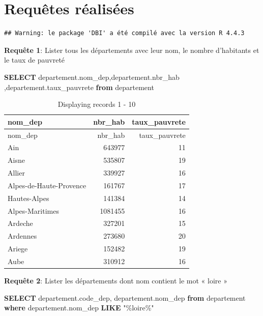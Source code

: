 \documentclass[mstat,12pt]{unswthesis}
\newenvironment{Shaded}{\begin{snugshade}}{\end{snugshade}}
\newcommand{\KeywordTok}[1]{\textcolor[rgb]{0.13,0.29,0.53}{\textbf{#1}}}
\newcommand{\NormalTok}[1]{#1}
\newcommand{\OtherTok}[1]{\textcolor[rgb]{0.56,0.35,0.01}{#1}}
\begin{document}
\bigskip

\section{Requêtes réalisées}\label{requuxeates-ruxe9alisuxe9es}

\begin{verbatim}
## Warning: le package 'DBI' a été compilé avec la version R 4.4.3
\end{verbatim}

\textbf{Requête 1}: Lister tous les départements avec leur nom, le
nombre d'habitants et le taux de pauvreté

\begin{Shaded}
\begin{Highlighting}[]
\KeywordTok{SELECT}\NormalTok{ departement.nom\_dep,departement.nbr\_hab ,departement.taux\_pauvrete}
\KeywordTok{from}\NormalTok{ departement}
\end{Highlighting}
\end{Shaded}

\begin{longtable}[]{@{}lrr@{}}
\caption{Displaying records 1 - 10}\tabularnewline
\toprule\noalign{}
nom\_dep & nbr\_hab & taux\_pauvrete \\
\midrule\noalign{}
\endfirsthead
\toprule\noalign{}
nom\_dep & nbr\_hab & taux\_pauvrete \\
\midrule\noalign{}
\endhead
\bottomrule\noalign{}
\endlastfoot
Ain & 643977 & 11 \\
Aisne & 535807 & 19 \\
Allier & 339927 & 16 \\
Alpes-de-Haute-Provence & 161767 & 17 \\
Hautes-Alpes & 141384 & 14 \\
Alpes-Maritimes & 1081455 & 16 \\
Ardeche & 327201 & 15 \\
Ardennes & 273680 & 20 \\
Ariege & 152482 & 19 \\
Aube & 310912 & 16 \\
\end{longtable}

\medskip

\textbf{Requête 2}: Lister les départements dont nom contient le mot «
loire »

\begin{Shaded}
\begin{Highlighting}[]
\KeywordTok{SELECT}\NormalTok{ departement.code\_dep, departement.nom\_dep}
\KeywordTok{from}\NormalTok{ departement}
\KeywordTok{where}\NormalTok{ departement.nom\_dep }\KeywordTok{LIKE} \OtherTok{"\%loire\%"}
\end{Highlighting}
\end{Shaded}
\end{document}
